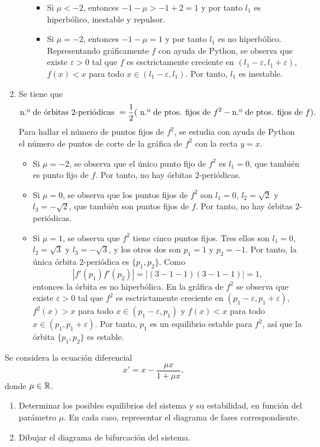 \documentclass[11pt]{report}
\begin{document}
\begin{solution}
\begin{enumerate}
\begin{itemize}
\begin{itemize}
                \item Si $\mu < -2$, entonces $-1-\mu>-1+2 = 1$ y por tanto $l_1$ es hiperbólico, inestable y repulsor.
                \item Si $\mu = -2$, entonces $-1-\mu = 1$ y por tanto $l_1$ es no hiperbólico. Representando gráficamente $f$ con ayuda de Python, se observa que existe $\varepsilon>0$ tal que $f$ es esctrictamente creciente en $(l_1-\varepsilon,l_1+\varepsilon)$, $f(x) < x$ para todo $x \in (l_1-\varepsilon,l_1)$. Por tanto, $l_1$ es inestable.
            \end{itemize}
        \end{itemize}
        \item Se tiene que
        \[\textup{n.º de órbitas } 2 \textup{-periódicas } = \frac{1}{2}(\textup{ n.º de ptos. fijos de } f^2 - \textup{n.º de ptos. fijos de } f).\]
        Para hallar el número de puntos fijos de $f^2$, se estudia con ayuda de Python el número de puntos de corte de la gráfica de $f^2$ con la recta $y = x$.
        \begin{itemize}
            \item Si $\mu = -2$, se observa que el único punto fijo de $f^2$ es $l_1 = 0$, que también es punto fijo de $f$. Por tanto, no hay órbitas $2$-periódicas.
            \item Si $\mu = 0$, se observa que los puntos fijos de $f^2$ son $l_1 = 0$, $l_2 = \sqrt{2}$ y $l_3 = -\sqrt{2}$, que también son puntos fijos de $f$. Por tanto, no hay órbitas $2$-periódicas.
            \item Si $\mu = 1$, se observa que $f^2$ tiene cinco puntos fijos. Tres ellos son $l_1=0$, $l_2 = \sqrt{3}$ y $l_3 = -\sqrt{3}$, y los otros dos son $p_1 = 1$ y $p_2 = -1$. Por tanto, la única órbita $2$-periódica es $\{p_1,p_2\}$. Como
            \[|f'(p_1)f'(p_2)| = |(3-1-1)(3-1-1)| = 1,\]
            entonces la órbita es no hiperbólica. En la gráfica de $f^2$ se observa que existe $\varepsilon > 0$ tal que $f^2$ es esctrictamente creciente en $(p_1-\varepsilon,p_1+\varepsilon)$, $f^2(x) > x$ para todo $x \in (p_1-\varepsilon,p_1)$ y $f(x) < x$ para todo $x \in (p_1,p_1+\varepsilon)$. Por tanto, $p_1$ es un equilibrio estable para $f^2$, así que la órbita $\{p_1,p_2\}$ es estable.
        \end{itemize}
    \end{enumerate}
\end{solution}

\begin{exercise}[Junio de 2021]
    Se considera la ecuación diferencial
    \[x' = x-\frac{\mu x}{1+\mu x},\]
    donde $\mu \in \mathbb R$.
    \begin{enumerate}
        \item Determinar los posibles equilibrios del sistema y su estabilidad, en función del parámetro $\mu$. En cada caso, representar el diagrama de fases correspondiente.
        \item Dibujar el diagrama de bifurcación del sistema.
    \end{enumerate}
\end{exercise}
\end{document}
